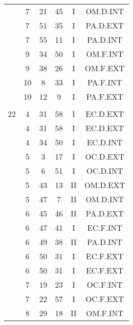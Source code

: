 \documentclass[12pt, a4paper]{article}
\begin{document}
\begin{multicols}{3}
{\begin{tabular}{c c c c c c}
	 	 	 	 & 7 & 21 & 45 & I & OM.D.INT\\%
	 	 	 	 & 7 & 51 & 35 & I & PA.D.EXT\\%
	 	 	 	 & 7 & 55 & 11 & I & PA.D.INT\\%
	 	 	 	 & 9 & 34 & 50 & I & OM.F.INT\\%
	 	 	 	 & 9 & 38 & 26 & I & OM.F.EXT\\%
	 	 	 	 & 10 & 8 & 33 & I & PA.F.INT\\%
	 	 	 	 & 10 & 12 & 9 & I & PA.F.EXT\\%
	 	 	 	 & & & & & \\%
	 	 	 	22 & 4 & 31 & 58 & I & EC.D.EXT\\%
	 	 	 	 & 4 & 31 & 58 & I & EC.D.EXT\\%
	 	 	 	 & 4 & 34 & 50 & I & EC.D.INT\\%
	 	 	 	 & 5 & 3 & 17 & I & OC.D.EXT\\%
	 	 	 	 & 5 & 6 & 51 & I & OC.D.INT\\%
	 	 	 	 & 5 & 43 & 13 & II & OM.D.EXT\\%
	 	 	 	 & 5 & 47 & 7 & II & OM.D.INT\\%
	 	 	 	 & 6 & 45 & 46 & II & PA.D.EXT\\%
	 	 	 	 & 6 & 47 & 41 & I & EC.F.INT\\%
	 	 	 	 & 6 & 49 & 38 & II & PA.D.INT\\%
	 	 	 	 & 6 & 50 & 31 & I & EC.F.EXT\\%
	 	 	 	 & 6 & 50 & 31 & I & EC.F.EXT\\%
	 	 	 	 & 7 & 19 & 23 & I & OC.F.INT\\%
	 	 	 	 & 7 & 22 & 57 & I & OC.F.EXT\\%
	 	 	 	 & 8 & 29 & 18 & II & OM.F.INT\\%

\end{tabular}}
\end{multicols}
\end{document}
